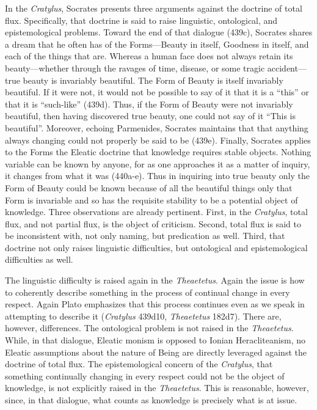 In the \emph{Cratylus}, Socrates presents three arguments against the doctrine of total flux. Specifically, that doctrine is said to raise linguistic, ontological, and epistemological problems. Toward the end of that dialogue (439c), Socrates shares a dream that he often has of the Forms---Beauty in itself, Goodness in itself, and each of the things that are. Whereas a human face does not always retain its beauty---whether through the ravages of time, disease, or some tragic accident---true beauty is invariably beautiful. The Form of Beauty is itself invariably beautiful. If it were not, it would not be possible to say of it that it is a ``this'' or that it is ``such-like'' (439d). Thus, if the Form of Beauty were not invariably beautiful, then having discovered true beauty, one could not say of it ``This is beautiful''.  Moreover, echoing Parmenides, Socrates maintains that that anything always changing could not properly be said to be (439e). Finally, Socrates applies to the Forms the Eleatic doctrine that knowledge requires stable objects. Nothing variable can be known by anyone, for as one approaches it as a matter of inquiry, it changes from what it was (440a-e). Thus in inquiring into true beauty only the Form of Beauty could be known because of all the beautiful things only that Form is invariable and so has the requisite stability to be a potential object of knowledge. Three observations are already pertinent. First, in the \emph{Cratylus}, total flux, and not partial flux, is the object of criticism. Second, total flux is said to be inconsistent with, not only naming, but predication as well. Third, that doctrine not only raises linguistic difficulties, but ontological and epistemological difficulties as well.

The linguistic difficulty is raised again in the \emph{Theaetetus}. Again the issue is how to coherently describe something in the process of continual change in every respect. Again Plato emphasizes that this process continues even as we speak in attempting to describe it (\emph{Cratylus} 439d10, \emph{Theaetetus} 182d7). There are, however, differences. The ontological problem is not raised in the \emph{Theaetetus}. While, in that dialogue, Eleatic monism is opposed to Ionian Heracliteanism, no Eleatic assumptions about the nature of Being are directly leveraged against the doctrine of total flux. The epistemological concern of the \emph{Cratylus}, that something continually changing in every respect could not be the object of knowledge, is not explicitly raised in the \emph{Theaetetus}. This is reasonable, however, since, in that dialogue, what counts as knowledge is precisely what is at issue. 

